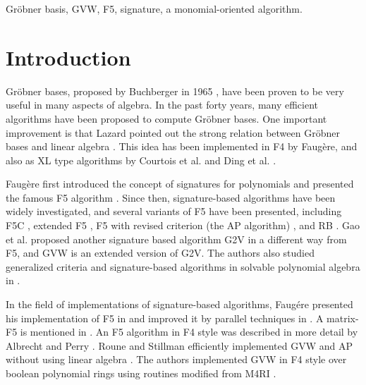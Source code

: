 \documentclass[final, number, 3p,12pt]{elsarticle}
\begin{document}
\begin{frontmatter}
\begin{keyword}
Gr\"obner basis, GVW, F5, signature, a monomial-oriented algorithm.


\end{keyword}

\end{frontmatter}






\section{Introduction} \label{sec_intro}


Gr\"obner bases, proposed by Buchberger in 1965 \citep{Buchberger65}, have been proven to be very useful in many aspects of algebra. In the past forty years, many efficient algorithms have been proposed to compute Gr\"obner bases. One important improvement is that Lazard pointed out the strong relation between Gr\"obner bases and linear algebra \citep{Lazard83}. This idea has been implemented  in F4 by Faug\`ere\citep{Fau99}, and also as XL type algorithms by Courtois et al. \citep{Courtois00} and Ding et al. \citep{Ding08}. 

Faug\`ere first introduced the concept of signatures for polynomials and presented the famous F5 algorithm \citep{Fau02}. Since then, signature-based algorithms have been widely investigated, and several variants of F5  have been presented, including F5C \citep{Eder10}, extended F5 \citep{Ars10}, F5 with revised criterion (the AP algorithm) \citep{Arri11}, and RB \citep{Roune13}.  Gao et al. proposed another signature based algorithm G2V \citep{Gao10a} in a different way from F5, and GVW\citep{Gao10b} is an extended version of G2V. The authors also studied generalized criteria and signature-based algorithms in solvable polynomial algebra in \citep{SunWang11b, SunWang12}.


In the field of implementations of signature-based algorithms, Faug\'ere presented his implementation of F5 in \citep{Fau02} and  improved it by parallel techniques in \citep{Fau10}.
A matrix-F5 is mentioned in \citep{Fau09,Bardet13}. 
An F5 algorithm in F4 style was described in more detail by Albrecht and Perry \citep{Albrecht10}. Roune and Stillman efficiently implemented  GVW and  AP without using linear algebra \citep{Roune12}. The authors implemented GVW in F4 style \citep{SunDW14} over boolean polynomial rings using routines modified from M4RI \citep{Albrecht13}.
\end{document}
